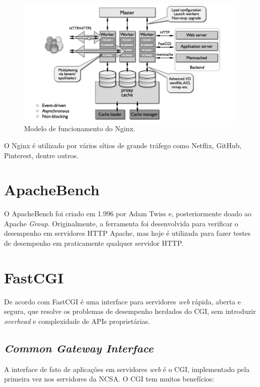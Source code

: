 \begin{figure}[h!]
	\centering
	\includegraphics[scale=1]{figuras/nginx-how-it-works} 
	\caption{Modelo de funcionamento do Nginx.}
	\label{fig:nginx-comofunciona}
\end{figure}

O Nginx é utilizado por vários sítios de grande tráfego como Netflix, GitHub, 
Pinterest, dentre outros.

\section{ApacheBench}
O ApacheBench foi criado em 1.996 por Adam Twiss e, posteriormente doado ao 
Apache \textit{Group}. Originalmente, a ferramenta foi desenvolvida para 
verificar o desempenho em servidores HTTP Apache, mas hoje é utilizada para 
fazer testes de desempenho em  praticamente qualquer servidor HTTP.

\section{FastCGI}

De acordo com  FastCGI é uma interface para servidores 
\textit{web} rápida, aberta e segura, que resolve os problemas de desempenho 
herdados do CGI, sem introduzir \textit{overhead} e complexidade de APIs 
proprietárias.

\subsection{\textit{Common Gateway Interface}}

A interface de fato de aplicações em servidores \textit{web} é o CGI, 
implementado pela primeira vez nos servidores da NCSA. O CGI tem muitos 
benefícios:

